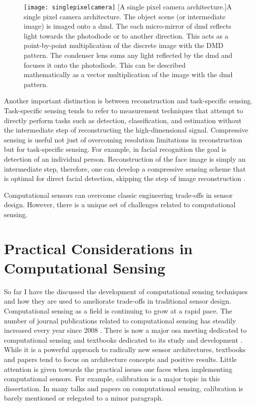 \begin{figure}
    \texttt{[image: singlepixelcamera]}
    [A single pixel camera architecture.]{A single pixel camera architecture. The object scene (or intermediate image) is imaged onto a \gls{dmd}. The each micro-mirror of \gls{dmd} reflects light towards the photodiode or to another direction. This acts as a point-by-point multiplication of the discrete image with the DMD pattern. The condenser lens sums any light reflected by the \gls{dmd} and focuses it onto the photodiode. This can be described mathematically as a vector multiplication of the image with the \gls{dmd} pattern. }
    \label{fig:singlepixelcamera}
\end{figure}

Another important distinction is between reconstruction and task-specific sensing. Task-specific sensing tends to refer to measurement techniques that attempt to directly perform tasks such as detection, classification, and estimation without the intermediate step of reconstructing the high-dimensional signal. Compressive sensing is useful not just of overcoming resolution limitations in reconstruction but for task-specific sensing. For example, in facial recognition the goal is detection of an individual person. Reconstruction of the face image is simply an intermediate step, therefore, one can develop a compressive sensing scheme that is optimal for direct facial detection, skipping the step of image reconstruction \cite{pal2005face}. 

Computational sensors can overcome classic engineering trade-offs in sensor design. However, there is a unique set of challenges related to computational sensing.

\section{Practical Considerations in Computational Sensing}

So far I have the discussed the development of computational sensing techniques and how they are used to ameliorate trade-offs in traditional sensor design. Computational sensing as a field is continuing to grow at a rapid pace. The number of journal publications related to computational sensing has steadily increased every year since 2008 \cite{stern2016hurdles}. There is now a major \gls{osa} meeting dedicated to computational sensing \cite{cosi2016meetingwebsite} and textbooks dedicated to its study and development \cite{brady2009optical, foucart2013mathematical}. While it is a powerful approach to radically new sensor architectures, textbooks and papers tend to focus on architecture concepts and positive results. Little attention is given towards the practical issues one faces when implementing computational sensors. For example, calibration is a major topic in this dissertation. In many talks and papers on computational sensing, calibration is barely mentioned or relegated to a minor paragraph. 

